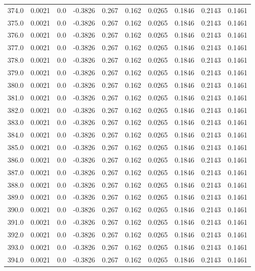 \begin{longtable}{lrrrrrrrrr}
374.0 & 0.0021 & 0.0 & -0.3826 & 0.267 & 0.162 & 0.0265 & 0.1846 & 0.2143 & 0.1461 \\
375.0 & 0.0021 & 0.0 & -0.3826 & 0.267 & 0.162 & 0.0265 & 0.1846 & 0.2143 & 0.1461 \\
376.0 & 0.0021 & 0.0 & -0.3826 & 0.267 & 0.162 & 0.0265 & 0.1846 & 0.2143 & 0.1461 \\
377.0 & 0.0021 & 0.0 & -0.3826 & 0.267 & 0.162 & 0.0265 & 0.1846 & 0.2143 & 0.1461 \\
378.0 & 0.0021 & 0.0 & -0.3826 & 0.267 & 0.162 & 0.0265 & 0.1846 & 0.2143 & 0.1461 \\
379.0 & 0.0021 & 0.0 & -0.3826 & 0.267 & 0.162 & 0.0265 & 0.1846 & 0.2143 & 0.1461 \\
380.0 & 0.0021 & 0.0 & -0.3826 & 0.267 & 0.162 & 0.0265 & 0.1846 & 0.2143 & 0.1461 \\
381.0 & 0.0021 & 0.0 & -0.3826 & 0.267 & 0.162 & 0.0265 & 0.1846 & 0.2143 & 0.1461 \\
382.0 & 0.0021 & 0.0 & -0.3826 & 0.267 & 0.162 & 0.0265 & 0.1846 & 0.2143 & 0.1461 \\
383.0 & 0.0021 & 0.0 & -0.3826 & 0.267 & 0.162 & 0.0265 & 0.1846 & 0.2143 & 0.1461 \\
384.0 & 0.0021 & 0.0 & -0.3826 & 0.267 & 0.162 & 0.0265 & 0.1846 & 0.2143 & 0.1461 \\
385.0 & 0.0021 & 0.0 & -0.3826 & 0.267 & 0.162 & 0.0265 & 0.1846 & 0.2143 & 0.1461 \\
386.0 & 0.0021 & 0.0 & -0.3826 & 0.267 & 0.162 & 0.0265 & 0.1846 & 0.2143 & 0.1461 \\
387.0 & 0.0021 & 0.0 & -0.3826 & 0.267 & 0.162 & 0.0265 & 0.1846 & 0.2143 & 0.1461 \\
388.0 & 0.0021 & 0.0 & -0.3826 & 0.267 & 0.162 & 0.0265 & 0.1846 & 0.2143 & 0.1461 \\
389.0 & 0.0021 & 0.0 & -0.3826 & 0.267 & 0.162 & 0.0265 & 0.1846 & 0.2143 & 0.1461 \\
390.0 & 0.0021 & 0.0 & -0.3826 & 0.267 & 0.162 & 0.0265 & 0.1846 & 0.2143 & 0.1461 \\
391.0 & 0.0021 & 0.0 & -0.3826 & 0.267 & 0.162 & 0.0265 & 0.1846 & 0.2143 & 0.1461 \\
392.0 & 0.0021 & 0.0 & -0.3826 & 0.267 & 0.162 & 0.0265 & 0.1846 & 0.2143 & 0.1461 \\
393.0 & 0.0021 & 0.0 & -0.3826 & 0.267 & 0.162 & 0.0265 & 0.1846 & 0.2143 & 0.1461 \\
394.0 & 0.0021 & 0.0 & -0.3826 & 0.267 & 0.162 & 0.0265 & 0.1846 & 0.2143 & 0.1461 \\

\end{longtable}
